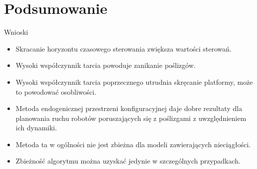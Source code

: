 \documentclass{beamer}
\begin{document}
\section{Podsumowanie}
\begin{frame}{Wnioski}
\begin{itemize}
\item Skracanie horyzontu czasowego sterowania zwiększa wartości sterowań.
\item Wysoki współczynnik tarcia powoduje zanikanie poślizgów.
\item Wysoki współczynnik tarcia poprzecznego utrudnia skręcanie platformy, może to powodować osobliwości.
\item Metoda endogenicznej przestrzeni konfiguracyjnej daje dobre rezultaty dla planowania ruchu robotów poruszających się z poślizgami z uwzględnieniem ich dynamiki.
\item Metoda ta w ogólności nie jest zbieżna dla modeli zawierających nieciągłości.
\item Zbieżność algorytmu można uzyskać jedynie w szczególnych przypadkach.
\end{itemize}
\end{frame}
\end{document}
